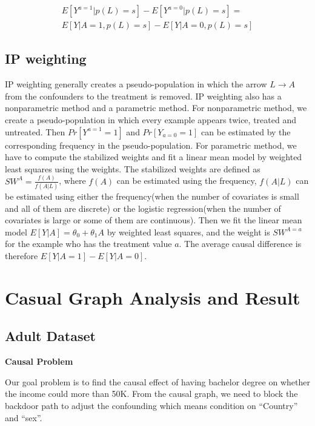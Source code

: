 \documentclass[letterpaper,12pt]{article}
\begin{document}
\begin{footnotesize}
\begin{equation}
\begin{split}
E[Y^{a=1}|p(L)=s]-E[Y^{a=0}|p(L)=s]= \\
E[Y|A=1,p(L)=s]-E[Y|A=0,p(L)=s]
\end{split}
\end{equation}
\end{footnotesize}

\subsection{IP weighting}
IP weighting generally creates a pseudo-population in which the arrow $L \rightarrow A$ from the confounders to the treatment is removed. IP weighting also has a nonparametric method and a parametric method. For nonparametric method, we create a pseudo-population in which every example appears twice, treated and untreated. Then $Pr[Y^{a=1}=1]$ and $Pr[Y_{a=0}=1]$ can be estimated by the corresponding frequency in the pseudo-population. 
For parametric method, we have to compute the stabilized weights and fit a linear mean model by weighted least squares using the weights. The stabilized weights are defined as $SW^{A}=\frac{f(A)}{f(A|L)}$, where $f(A)$ can be estimated using the frequency, $f(A|L)$ can be estimated using either the frequency(when the number of covariates is small and all of them are discrete) or the logistic regression(when the number of covariates is large or some of them are continuous). Then we fit the linear mean model $E[Y|A]=\theta_{0}+\theta_{1}A$ by weighted least squares, and the weight is $SW^{A=a}$ for the example who has the treatment value $a$. The average causal difference is therefore $E[Y|A=1]-E[Y|A=0]$.


\section{Casual Graph Analysis and Result}
\subsection{Adult Dataset}

\textbf{Causal Problem}\par
Our goal problem is to find the causal effect of having bachelor degree on whether the income could more than 50K. From the causal graph, we need to block the backdoor path to adjust  the confounding which means condition on “Country” and “sex”. \par
\end{document}

